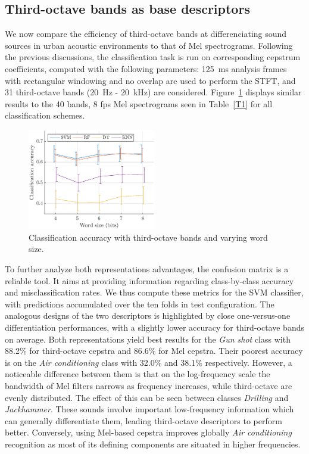\documentclass[sensors,article,submit,moreauthors,pdftex,10pt,a4paper]{mdpi}
\begin{document}
\subsection{Third-octave bands as base descriptors} \label{sec:tob_r}

We now compare the efficiency of third-octave bands at differenciating sound sources in urban acoustic environments to that of Mel spectrograms. Following the previous discussions, the classification task is run on corresponding cepstrum coefficients, computed with the following parameters: 125~ms analysis frames with rectangular windowing and no overlap are used to perform the STFT, and 31 third-octave bands (20~Hz - 20~kHz) are considered. Figure~\ref{fig:class_tob_q} displays similar results to the 40 bands, 8 fps Mel spectrograms seen in Table~\ref{T1} for all classification schemes.\\

\begin{figure}[htbp]
	\centering
		\includegraphics[width=0.5\textwidth]{figures/class_tob_q.eps}
	\caption{Classification accuracy with third-octave bands and varying word size.}
	\label{fig:class_tob_q}
\end{figure}

To further analyze both representations advantages, the confusion matrix is a reliable tool. It aims at providing information regarding class-by-class accuracy and misclassification rates. We thus compute these metrics for the SVM classifier, with predictions accumulated over the ten folds in test configuration. The analogous designs of the two descriptors is highlighted by close one-versus-one differentiation performances, with a slightly lower accuracy for third-octave bands on average. Both representations yield best results for the \textit{Gun shot} class with 88.2\% for third-octave cepstra and 86.6\% for Mel cepstra. Their poorest accuracy is on the \textit{Air conditioning} class with 32.0\% and 38.1\% respectively. However, a noticeable difference between them is that on the log-frequency scale the bandwidth of Mel filters narrows as frequency increases, while third-octave are evenly distributed. The effect of this can be seen between classes \textit{Drilling} and \textit{Jackhammer}. These sounds involve important low-frequency information which can generally differentiate them, leading third-octave descriptors to perform better. Conversely, using Mel-based cepstra improves globally \textit{Air conditioning} recognition as most of its defining components are situated in higher frequencies.
\end{document}
